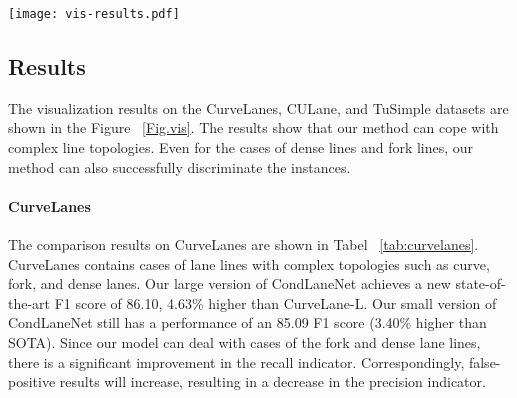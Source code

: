 \documentclass[10pt,twocolumn,letterpaper]{article}
\begin{document}
{\begin{figure*}[ht]
\centering
\texttt{[image: vis-results.pdf]}
\caption{Visualization results on CurveLanes(the first row), CULane(the middle row) and TuSimple(the last row) datasets. Different lane instances are represented by different colors.
}
\label{Fig.vis} \end{figure*}}
\subsection{Results}
The visualization results on the CurveLanes, CULane, and TuSimple datasets are shown in the Figure ~\ref{Fig.vis}.
The results show that our method can cope with complex line topologies. Even for the cases of dense lines and fork lines, our method can also successfully discriminate the instances.


\paragraph{CurveLanes}
\begin{table}[h]
\centering
{}
\caption{Comparison of different methods on CurveLanes.}
\label{tab:curvelanes}
\end{table}

The comparison results on CurveLanes are shown in Tabel ~\ref{tab:curvelanes}. CurveLanes contains cases of lane lines with complex topologies such as curve, fork, and dense lanes. Our large version of CondLaneNet achieves a new state-of-the-art F1 score of 86.10, 4.63\% higher than CurveLane-L. Our small version of CondLaneNet still has a performance of an 85.09 F1 score (3.40\% higher than SOTA). Since our model can deal with cases of the fork and dense lane lines, there is a significant improvement in the recall indicator. Correspondingly, false-positive results will increase, resulting in a decrease in the precision indicator.
\end{document}
